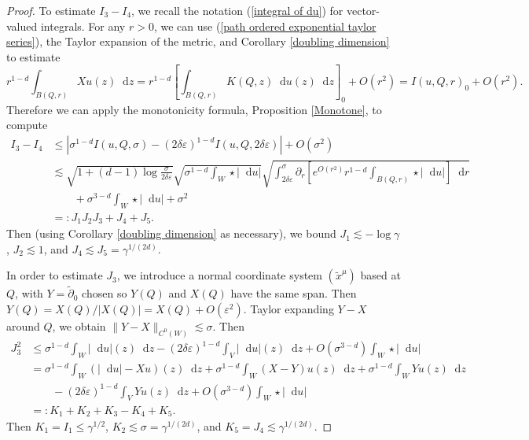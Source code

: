 \documentclass[reqno,11pt]{amsart}
\newcommand*\dif{\mathop{}\!\mathrm{d}}
\theoremstyle{definition}
\numberwithin{equation}{section}
\begin{document}
\begin{proof}
To estimate $I_3 - I_4$, we recall the notation (\ref{integral of du}) for vector-valued integrals.
For any $r > 0$, we can use (\ref{path ordered exponential taylor series}), the Taylor expansion of the metric, and Corollary \ref{doubling dimension} to estimate
$$r^{1 - d} \int_{B(Q, r)} Xu(z) \dif z = r^{1 - d} \left[\int_{B(Q, r)} K(Q, z) \dif u(z) \dif z\right]_0 + O(r^2) = I(u, Q, r)_0 + O(r^2).$$
Therefore we can apply the monotonicity formula, Proposition \ref{Monotone}, to compute
\begin{align*}
    I_3 - I_4 & \leq |\sigma^{1 - d} I(u, Q, \sigma) - (2 \delta \varepsilon)^{1 - d} I(u, Q, 2 \delta \varepsilon)| + O(\sigma^2) \\
    &\lesssim \sqrt{1 + (d - 1) \log \frac{\sigma}{2\delta\varepsilon}} \sqrt{\sigma^{1 - d} \int_W \star |\dif u|} \sqrt{\int_{2\delta\varepsilon}^\sigma \partial_r \left[e^{O(r^2)} r^{1 - d} \int_{B(Q, r)} \star |\dif u|\right] \dif r}\\
&\qquad + \sigma^{3 - d} \int_W \star |\dif u| + \sigma^2 \\
&=: J_1 J_2 J_3 + J_4 + J_5.
\end{align*}
Then (using Corollary \ref{doubling dimension} as necessary), we bound $J_1 \lesssim -\log \gamma$, $J_2 \lesssim 1$, and $J_4 \lesssim J_5 = \gamma^{1/(2d)}$.

In order to estimate $J_3$, we introduce a normal coordinate system $(\tilde x^\mu)$ based at $Q$, with $Y = \tilde \partial_0$ chosen so $Y(Q)$ and $X(Q)$ have the same span.
Then $Y(Q) = X(Q)/|X(Q)| = X(Q) + O(\varepsilon^2)$.
Taylor expanding $Y - X$ around $Q$, we obtain $\|Y - X\|_{C^0(W)} \lesssim \sigma$.
Then
\begin{align*}
J_3^2 &\leq \sigma^{1 - d} \int_W |\dif u|(z) \dif z - (2 \delta \varepsilon)^{1 - d} \int_V |\dif u|(z) \dif z + O(\sigma^{3 - d}) \int_W \star |\dif u| \\
&= \sigma^{1 - d} \int_W (|\dif u| - Xu)(z) \dif z + \sigma^{1 - d} \int_W (X - Y)u(z) \dif z + \sigma^{1 - d} \int_W Yu(z) \dif z \\
  &\qquad - (2 \delta\varepsilon)^{1 - d} \int_V Y u(z) \dif z + O(\sigma^{3 - d}) \int_W \star |\dif u| \\
&=: K_1 + K_2 + K_3 - K_4 + K_5.
\end{align*}
Then $K_1 = I_1 \leq \gamma^{1/2}$, $K_2 \lesssim \sigma = \gamma^{1/(2d)}$, and $K_5 = J_4 \lesssim \gamma^{1/(2d)}$.


\end{proof}
\end{document}
